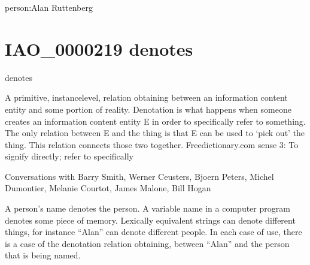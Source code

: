 \documentclass[letterpaper,10pt,english]{sphinxmanual}
\begin{document}
\begin{sphinxShadowBox}

\sphinxAtStartPar
person:Alan Ruttenberg
\end{sphinxShadowBox}
\begin{quote}
\label{\detokenize{doc-IAO_0000219:iao-0000219}}\label{\detokenize{doc-IAO_0000219:denotes}}\label{\detokenize{doc-IAO_0000219:iao-0000219}}
\ignorespaces \end{quote}


\section{IAO\_0000219 \sphinxhyphen{} denotes}
\label{\detokenize{doc-IAO_0000219:iao-0000219-denotes}}\label{\detokenize{doc-IAO_0000219:index-0}}\label{\detokenize{doc-IAO_0000219::doc}}
\begin{sphinxShadowBox}

\sphinxAtStartPar
denotes
\end{sphinxShadowBox}

\begin{sphinxShadowBox}

\sphinxAtStartPar
A primitive, instance\sphinxhyphen{}level, relation obtaining between an information content entity and some portion of reality. Denotation is what happens when someone creates an information content entity E in order to specifically refer to something. The only relation between E and the thing is that E can be used to ‘pick out’ the thing. This relation connects those two together. Freedictionary.com sense 3: To signify directly; refer to specifically
\end{sphinxShadowBox}

\begin{sphinxShadowBox}

\sphinxAtStartPar
Conversations with Barry Smith, Werner Ceusters, Bjoern Peters, Michel Dumontier, Melanie Courtot, James Malone, Bill Hogan
\end{sphinxShadowBox}

\begin{sphinxShadowBox}

\sphinxAtStartPar
A person’s name denotes the person. A variable name in a computer program denotes some piece of memory. Lexically equivalent strings can denote different things, for instance “Alan” can denote different people. In each case of use, there is a case of the denotation relation obtaining, between “Alan” and the person that is being named.
\end{sphinxShadowBox}
\end{document}
